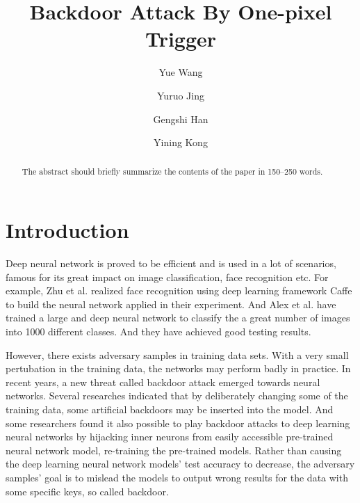 \documentclass[runningheads]{llncs}
\begin{document}
%
\title{Backdoor Attack By One-pixel Trigger}
%
%
\author{Yue Wang \and
Yuruo Jing \and
Gengshi Han \and
Yining Kong}
%
%
%
\maketitle              %
%
\begin{abstract}
The abstract should briefly summarize the contents of the paper in
150--250 words.

\end{abstract}
%
%
%
\section{Introduction}
Deep neural network is proved to be efficient and is used in a lot of scenarios, famous for its great impact on image classification, face recognition etc. For example, Zhu et al. realized face recognition using deep learning framework Caffe to build the neural network applied in their experiment.\cite{h1} And Alex et al. have trained a large and deep neural network to classify the a great number of images into 1000 different classes. And they have achieved good testing results.\cite{h2}

However, there exists adversary samples in training data sets. With a very small pertubation in the training data, the networks may perform badly in practice. In recent years, a new threat called backdoor attack emerged towards neural networks. Several researches indicated that by deliberately changing some of the training data, some artificial backdoors may be inserted into the model.\cite{h3} And some researchers found it also possible to play backdoor attacks to deep learning neural networks by hijacking inner neurons from easily accessible pre-trained neural network model, re-training the pre-trained models.\cite{h4} Rather than causing the deep learning neural network models’ test accuracy to decrease, the adversary samples’ goal is to mislead the models to output wrong results for the data with some specific keys, so called backdoor.
\end{document}
